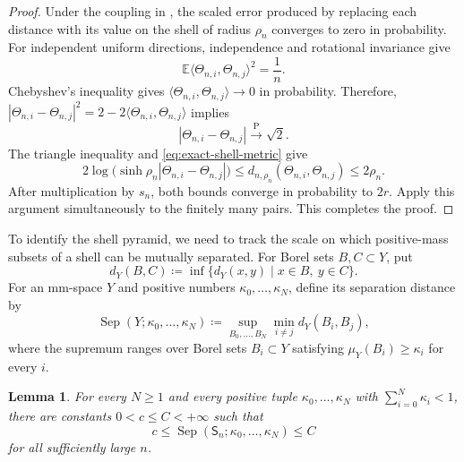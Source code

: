 \documentclass{amsart}
\numberwithin{equation}{section}
\theoremstyle{plain}
\newtheorem*{unnumberedlem}{Lemma}
\theoremstyle{definition}
\theoremstyle{remark}
\DeclareMathOperator{\Sep}{Sep}
\begin{document}
\begin{proof}
	Under the coupling in , the scaled error
	produced by replacing each distance with its value on the shell of radius
	$\rho_n$ converges to zero in probability.  For independent uniform
	directions, independence and rotational invariance give
	\[
		\mathbb E\langle\Theta_{n,i},\Theta_{n,j}\rangle^2=\frac1n.
	\]
	Chebyshev's inequality gives
	$\langle\Theta_{n,i},\Theta_{n,j}\rangle\to0$ in probability.  Therefore,
	$|\Theta_{n,i}-\Theta_{n,j}|^2
	=2-2\langle\Theta_{n,i},\Theta_{n,j}\rangle$ implies
\[ |\Theta_{n,i}-\Theta_{n,j}| \overset{\mathrm P}{\longrightarrow}\sqrt2. \]
	The triangle inequality and \eqref{eq:exact-shell-metric} give
	\[
		2\log\bigl(\sinh\rho_n
		|\Theta_{n,i}-\Theta_{n,j}|\bigr)
		\le
		d_{n,\rho_n}(\Theta_{n,i},\Theta_{n,j})
		\le2\rho_n.
	\]
	After multiplication by $s_n$, both bounds converge in probability to
	$2r$.  Apply this argument simultaneously to the finitely many pairs.
	This completes the proof.
\end{proof}

To identify the shell pyramid, we need to track the scale on which
positive-mass subsets of a shell can be mutually separated.  For Borel sets
$B,C\subset Y$, put
\[ d_Y(B,C)\coloneqq\inf\{d_Y(x,y)\mid x\in B,\ y\in C\}. \]
For an mm-space $Y$ and positive numbers $\kappa_0,\ldots,\kappa_N$, define
its separation distance by
\[ \Sep(Y;\kappa_0,\ldots,\kappa_N) \coloneqq \sup_{B_0,\ldots,B_N}\min_{i\ne j}d_Y(B_i,B_j), \]
where the supremum ranges over Borel sets $B_i\subset Y$ satisfying
$\mu_Y(B_i)\ge\kappa_i$ for every $i$.

\begin{unnumberedlem}
	For every $N\ge1$ and every positive tuple
	$\kappa_0,\ldots,\kappa_N$ with $\sum_{i=0}^N\kappa_i<1$, there are
	constants $0<c\le C<+\infty$ such that
	\[
		c\le\Sep(\mathsf S_n;\kappa_0,\ldots,\kappa_N)\le C
	\]
	for all sufficiently large $n$.
\end{unnumberedlem}
\end{document}

